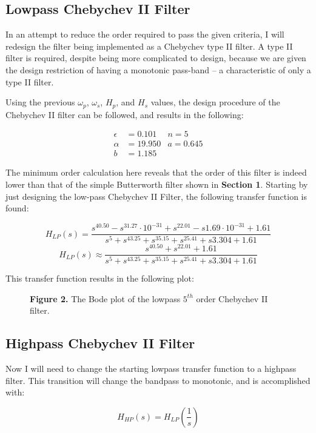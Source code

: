 \documentclass[11pt]{article}
\begin{document}
\subsection{Lowpass Chebychev II Filter}
In an attempt to reduce the order required to pass the given criteria, I will redesign the filter being implemented as a Chebychev type II filter. A type II filter is required, despite being more complicated to design, because we are given the design restriction of having a monotonic pass-band -- a characteristic of only a type II filter.

Using the previous $\omega _p$, $\omega _s$, $H_p$, and $H_s$ values, the design procedure of the Chebychev II filter can be followed, and results in the following:

\begin{align*}
\epsilon &= 0.101 &n = 5 \\
\alpha &=19.950 &a = 0.645\\
b &= 1.185
\end{align*}

The minimum order calculation here reveals that the order of this filter is indeed lower than that of the simple Butterworth filter shown in \textbf{Section 1}. Starting by just designing the low-pass Chebychev II Filter, the following transfer function is found:

$$H_{LP}(s)=\frac{s^40.50-s^31.27\cdot10^{-31}+s^22.01-s1.69\cdot10^{-31}+1.61}
{s^5+s^43.25+s^35.15+s^25.41+s3.304+1.61}$$
$$H_{LP}(s)\approx
\frac{s^40.50+s^22.01+1.61}
{s^5+s^43.25+s^35.15+s^25.41+s3.304+1.61}$$

This transfer function results in the following plot:

\begin{figure}[H]
\begin{center}
\caption{\textbf{Figure 2.} The Bode plot of the lowpass $5^{th}$ order Chebychev II filter.}
\end{center}
\end{figure}

\subsection{Highpass Chebychev II Filter}
Now I will need to change the starting lowpass transfer function to a highpass filter. This transition will change the bandpass to monotonic, and is accomplished with:

$$H_{HP}(s)=H_{LP}(\frac{1}{s})$$
\end{document}
